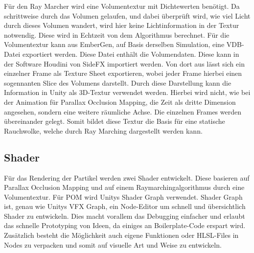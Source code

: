Für den Ray Marcher wird eine Volumentextur mit Dichtewerten benötigt. Da schrittweise durch das Volumen gelaufen, und dabei überprüft wird, wie viel Licht
durch dieses Volumen wandert, wird hier keine Lichtinformation in der Textur notwendig. Diese wird in Echtzeit von dem Algorithmus berechnet.
Für die Volumentextur kann aus EmberGen, auf Basis derselben Simulation, eine VDB-Datei exportiert werden.
Diese Datei enthält die Volumendaten. Diese kann in der Software Houdini von SideFX importiert werden. Von dort aus lässt sich ein einzelner Frame als Texture Sheet exportieren,
wobei jeder Frame hierbei einen sogennanten Slice des Volumens darstellt. Durch diese Darstellung kann die Information in Unity als 3D-Textur verwendet werden.
Hierbei wird nicht, wie bei der Animation für Parallax Occlusion Mapping, die Zeit als dritte Dimension angesehen, sondern eine weitere räumliche Achse.
Die einzelnen Frames werden übereinander gelegt. Somit bildet diese Textur die Basis für eine statische Rauchwolke, welche durch Ray Marching dargestellt werden kann.










\subsection{Shader}
Für das Rendering der Partikel werden zwei Shader entwickelt. Diese basieren auf Parallax Occlusion Mapping und auf einem Raymarchingalgorithmus
durch eine Volumentextur. Für POM wird Unitys Shader Graph verwendet. Shader Graph ist, genau wie Unitys VFX Graph, ein Node-Editor um
schnell und übersichtlich Shader zu entwickeln. Dies macht vorallem das Debugging einfacher und erlaubt das schnelle Prototyping von Ideen,
da einiges an Boilerplate-Code erspart wird. Zusätzlich besteht die Möglichkeit auch eigene Funktionen oder HLSL-Files in Nodes
zu verpacken und somit auf visuelle Art und Weise zu entwickeln.


